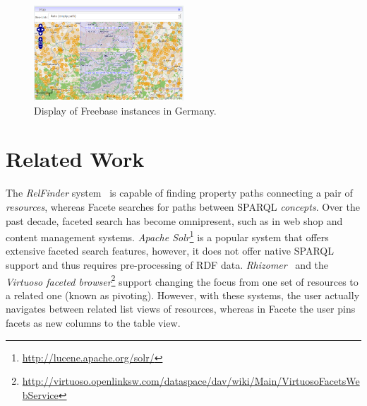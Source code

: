\begin{figure}
\centering
\includegraphics[width=0.5\textwidth]{images/facete-mii}
\caption{Display of Freebase instances in Germany.}
\label{fig:markers-freebase}
\end{figure}



\section{Related Work}
\label{sec:related-work}
The \emph{RelFinder} system~\cite{2009_relfinder} is capable of finding
property paths connecting a pair of \emph{resources}, whereas
Facete searches for paths between SPARQL \emph{concepts}.
Over the past decade, faceted search has become omnipresent, such as in
web shop and content management systems.
\emph{Apache Solr}\footnote{\url{http://lucene.apache.org/solr/}} is a popular system
that offers extensive faceted search features, however, it does not offer native
SPARQL support and thus requires pre-processing of RDF data.
\emph{Rhizomer}~\cite{2013_rhizomik} and the
\emph{Virtuoso faceted
browser}\footnote{\url{http://virtuoso.openlinksw.com/dataspace/dav/wiki/Main/VirtuosoFacetsWebService}}
support changing the focus from one set of resources to a related one
(known as pivoting). However, with these systems, the user actually navigates
between related list views of resources, whereas in Facete the user pins facets
as new columns to the table view.






